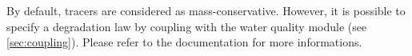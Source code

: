 By default,  tracers are considered as mass-conservative.
However, it is possible to specify a degradation law
by coupling  with the \waqtel water quality module
(see \ref{sec:coupling}).
Please refer to the \waqtel documentation for more informations.




